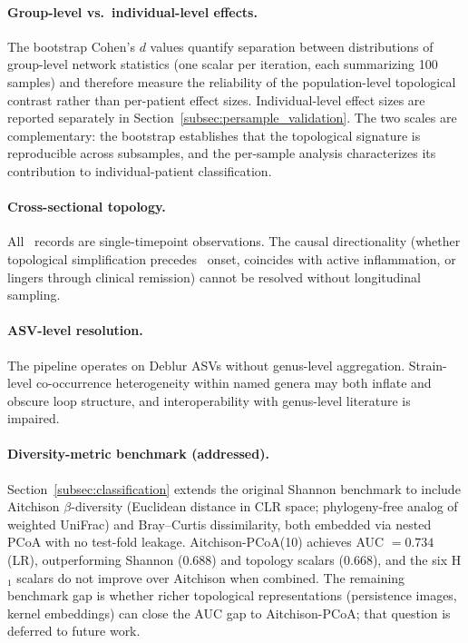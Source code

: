 \paragraph{Group-level vs.\ individual-level effects.}
The bootstrap Cohen's $d$ values quantify separation between distributions
of group-level network statistics (one scalar per iteration, each
summarizing 100 samples) and therefore measure the reliability of the
population-level topological contrast rather than per-patient effect sizes.
Individual-level effect sizes are reported separately in
Section~\ref{subsec:persample_validation}.
The two scales are complementary: the bootstrap establishes that the
topological signature is reproducible across subsamples, and the
per-sample analysis characterizes its contribution to individual-patient
classification.

\paragraph{Cross-sectional topology.}
All \agp\ records are single-timepoint observations.
The causal directionality (whether topological simplification precedes \ibd\
onset, coincides with active inflammation, or lingers through clinical
remission) cannot be resolved without longitudinal sampling.

\paragraph{ASV-level resolution.}
The pipeline operates on Deblur ASVs without genus-level aggregation.
Strain-level co-occurrence heterogeneity within named genera may both inflate
and obscure loop structure, and interoperability with genus-level literature
is impaired.

\paragraph{Diversity-metric benchmark (addressed).}
Section~\ref{subsec:classification} extends the original Shannon benchmark to
include Aitchison $\beta$-diversity (Euclidean distance in CLR space;
phylogeny-free analog of weighted UniFrac) and Bray--Curtis dissimilarity,
both embedded via nested PCoA with no test-fold leakage.
Aitchison-PCoA(10) achieves AUC $= 0.734$ (LR), outperforming Shannon
($0.688$) and topology scalars ($0.668$), and the six H$_1$ scalars do not
improve over Aitchison when combined.
The remaining benchmark gap is whether richer topological representations
(persistence images, kernel embeddings) can close the AUC gap to
Aitchison-PCoA; that question is deferred to future work.

